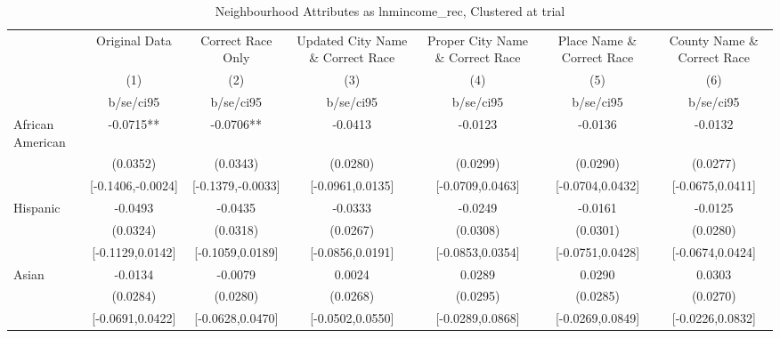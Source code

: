 \documentclass{article}
\begin{document}
\begin{table}[htbp]\centering
\def\sym#1{\ifmmode^{#1}\else\(^{#1}\)\fi}
\caption{Neighbourhood Attributes as lnmincome\_rec, Clustered at trial}
\begin{tabular}{l*{6}{c}}
\toprule
                    &\multicolumn{1}{c}{Original Data}&\multicolumn{1}{c}{Correct Race Only}&\multicolumn{1}{c}{Updated City Name \& Correct Race}&\multicolumn{1}{c}{Proper City Name \& Correct Race}&\multicolumn{1}{c}{Place Name \& Correct Race}&\multicolumn{1}{c}{County Name \& Correct Race}\\\cmidrule(lr){2-2}\cmidrule(lr){3-3}\cmidrule(lr){4-4}\cmidrule(lr){5-5}\cmidrule(lr){6-6}\cmidrule(lr){7-7}
                    &\multicolumn{1}{c}{(1)}   &\multicolumn{1}{c}{(2)}   &\multicolumn{1}{c}{(3)}   &\multicolumn{1}{c}{(4)}   &\multicolumn{1}{c}{(5)}   &\multicolumn{1}{c}{(6)}   \\
                    &   b/se/ci95   &   b/se/ci95   &   b/se/ci95   &   b/se/ci95   &   b/se/ci95   &   b/se/ci95   \\
\midrule
African American    &     -0.0715** &     -0.0706** &     -0.0413   &     -0.0123   &     -0.0136   &     -0.0132   \\
                    &    (0.0352)   &    (0.0343)   &    (0.0280)   &    (0.0299)   &    (0.0290)   &    (0.0277)   \\
                    &[-0.1406,-0.0024]   &[-0.1379,-0.0033]   &[-0.0961,0.0135]   &[-0.0709,0.0463]   &[-0.0704,0.0432]   &[-0.0675,0.0411]   \\
Hispanic            &     -0.0493   &     -0.0435   &     -0.0333   &     -0.0249   &     -0.0161   &     -0.0125   \\
                    &    (0.0324)   &    (0.0318)   &    (0.0267)   &    (0.0308)   &    (0.0301)   &    (0.0280)   \\
                    &[-0.1129,0.0142]   &[-0.1059,0.0189]   &[-0.0856,0.0191]   &[-0.0853,0.0354]   &[-0.0751,0.0428]   &[-0.0674,0.0424]   \\
Asian               &     -0.0134   &     -0.0079   &      0.0024   &      0.0289   &      0.0290   &      0.0303   \\
                    &    (0.0284)   &    (0.0280)   &    (0.0268)   &    (0.0295)   &    (0.0285)   &    (0.0270)   \\
                    &[-0.0691,0.0422]   &[-0.0628,0.0470]   &[-0.0502,0.0550]   &[-0.0289,0.0868]   &[-0.0269,0.0849]   &[-0.0226,0.0832]   \\

\end{tabular}
\end{table}
\end{document}
